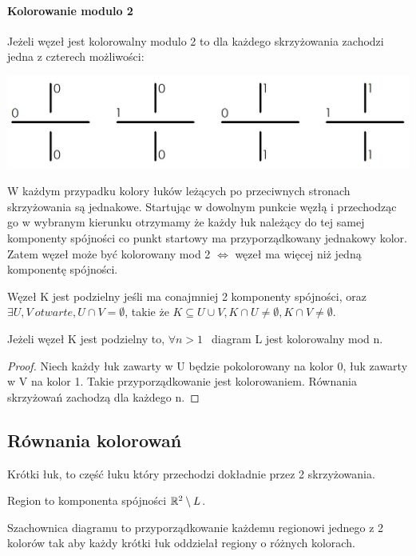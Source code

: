 \paragraph{Kolorowanie modulo 2} Jeżeli węzeł jest kolorowalny modulo 2 to dla każdego skrzyżowania zachodzi jedna z czterech możliwości:
	\begin{center}
			\includegraphics[scale=0.3]{2/Obrazy/Mod2}
	\end{center}
	W każdym przypadku kolory łuków leżących po przeciwnych stronach skrzyżowania są jednakowe. Startując w dowolnym punkcie węzłą i przechodząc go w wybranym kierunku otrzymamy że każdy łuk należący do tej samej komponenty spójności co punkt startowy ma przyporządkowany jednakowy kolor. Zatem węzeł może być kolorowany mod 2 $\Leftrightarrow$ węzeł ma więcej niż jedną komponentę spójności.
	
	\begin{definicja}
	Węzeł K jest podzielny jeśli ma conajmniej 2 komponenty spójności, oraz  $\exists U, V\:  otwarte, U \cap V = \emptyset$, takie że $ K\subseteq U\cup V, K\cap U \neq \emptyset, K\cap V \neq \emptyset$.
	\end{definicja}
	
	
\begin{lemat}
	Jeżeli węzeł K jest podzielny to, $\forall n >1 \:\:$ diagram L jest kolorowalny mod n.
\end{lemat}
	
\begin{proof}
Niech każdy łuk zawarty w U będzie pokolorowany na kolor 0, łuk zawarty w V na kolor 1. Takie przyporządkowanie jest kolorowaniem. Równania skrzyżowań zachodzą dla każdego n. 
\end{proof}


	
\subsection{Równania kolorowań}
\begin{definicja}
Krótki łuk, to część łuku który przechodzi dokładnie przez 2 skrzyżowania. 
\end{definicja}
\begin{definicja}
Region to komponenta spójności $\mathbb R^{2} \setminus L$.
\end{definicja}
\begin{definicja}
Szachownica diagramu to przyporządkowanie każdemu regionowi jednego z 2 kolorów tak aby każdy krótki łuk oddzielał regiony o różnych kolorach.
\end{definicja}

